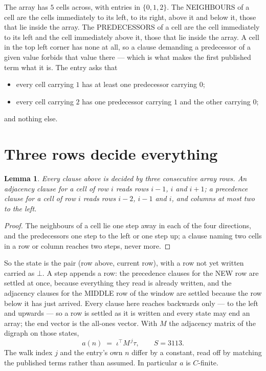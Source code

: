 \documentclass[11pt,a4paper]{article}
\theoremstyle{plain}
\newtheorem{lemma}[theorem]{Lemma}
\theoremstyle{definition}
\begin{document}
The array has $5$ cells across, with entries in $\{0,1,2\}$. The NEIGHBOURS of a cell are the
cells immediately to its left, to its right, above it and below it, those that lie inside the
array. The PREDECESSORS of a cell are the cell immediately to its left and the cell
immediately above it, those that lie inside the array. A cell in the top left corner has none
at all, so a clause demanding a predecessor of a given value forbids that value there --- which
is what makes the first published term what it is. The entry asks that
\begin{itemize}
\item every cell carrying $1$ has at least one predecessor carrying $0$;
\item every cell carrying $2$ has one predecessor carrying $1$ and the other carrying $0$;
\end{itemize}
and nothing else.

\section{Three rows decide everything}

\begin{lemma}\label{lem:win}
Every clause above is decided by three consecutive array rows. An adjacency clause for a cell
of row $i$ reads rows $i-1$, $i$ and $i+1$; a precedence clause for a cell of row $i$ reads
rows $i-2$, $i-1$ and $i$, and columns at most two to the left.
\end{lemma}

\begin{proof}
The neighbours of a cell lie one step away in each of the four directions, and the predecessors
one step to the left or one step up; a clause naming two cells in a row or column reaches two
steps, never more.
\end{proof}

So the state is the pair (row above, current row), with a row not yet written carried as
$\bot$. A step appends a row: the precedence clauses for the NEW row are settled at once,
because everything they read is already written, and the adjacency clauses for the MIDDLE row
of the window are settled because the row below it has just arrived. Every clause here reaches backwards only --- to the left and upwards --- so a
row is settled as it is written and every state may end an array; the end vector is the
all-ones vector. With $M$ the
adjacency matrix of the digraph on those states,
\[
a(n)\;=\;\iota^{\!\top}M^{\,j}\tau ,\qquad S=3113.
\]
The walk index $j$ and the entry's own $n$ differ by a constant, read off by matching the
published terms rather than assumed. In particular $a$ is $C$-finite.
\end{document}
